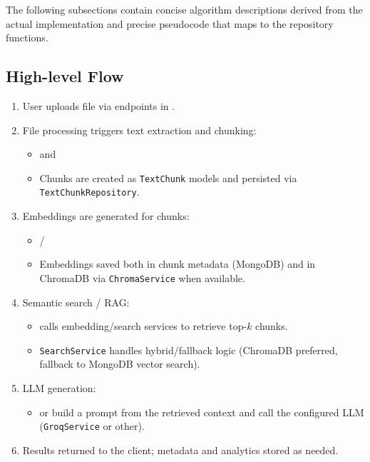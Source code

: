 The following subsections contain concise algorithm descriptions derived from the actual implementation and precise pseudocode that maps to the repository functions.

\subsection{High-level Flow}
{\small
\begin{enumerate}
    \item User uploads file via endpoints in \texttt{}.
    \item File processing triggers text extraction and chunking:
    \begin{itemize}
        \item \texttt{} and \texttt{}
        \item Chunks are created as \texttt{TextChunk} models and persisted via \texttt{TextChunkRepository}.
    \end{itemize}
    \item Embeddings are generated for chunks:
    \begin{itemize}
        \item \texttt{} / \texttt{}
        \item Embeddings saved both in chunk metadata (MongoDB) and in ChromaDB via \texttt{ChromaService} when available.
    \end{itemize}
    \item Semantic search / RAG:
    \begin{itemize}
        \item \texttt{} calls embedding/search services to retrieve top-$k$ chunks.
        \item \texttt{SearchService} handles hybrid/fallback logic (ChromaDB preferred, fallback to MongoDB vector search).
    \end{itemize}
    \item LLM generation:
    \begin{itemize}
        \item \texttt{} or \texttt{} build a prompt from the retrieved context and call the configured LLM (\texttt{GroqService} or other).
    \end{itemize}
    \item Results returned to the client; metadata and analytics stored as needed.
\end{enumerate}
}

